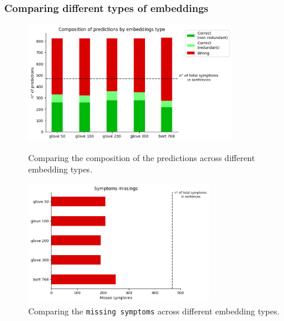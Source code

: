 \newpage
\subsubsection{Comparing different types of embeddings}

\begin{figure}[h]%
  \centering
  \begin{minipage}[b]{0.4\textwidth}
    \includegraphics[width=9cm]{graphs/comparison_embeddings_type}
    \caption{Comparing the composition of the predictions across different embedding types.}
  \end{minipage}
  \hfill
  \begin{minipage}[b]{0.4\textwidth}
    \includegraphics[width=8cm]{graphs/comparison_embeddings_type_missings}
    \caption{Comparing the \texttt{missing symptoms} across different embedding types.}
  \end{minipage}
\end{figure}

